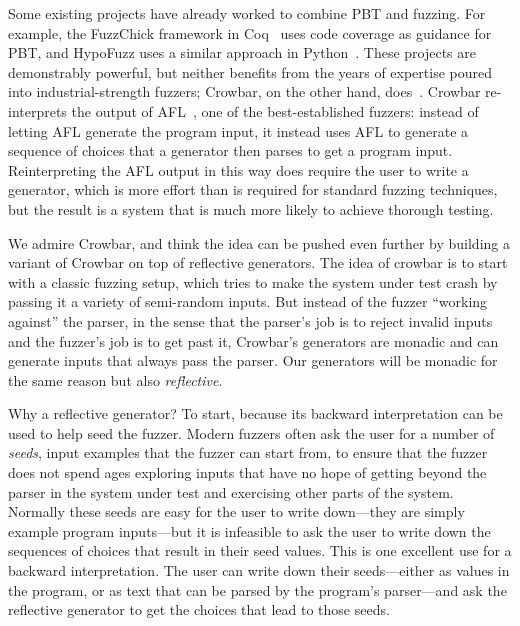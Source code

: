 Some existing projects have already worked to
combine PBT and fuzzing.
For example, the FuzzChick framework in Coq~\cite{DBLP:journals/pacmpl/Lampropoulos0P19}
uses code coverage as guidance for PBT, and HypoFuzz uses a
similar approach in Python~\cite{hatfield-dodds_hypofuzz_nodate}. These projects
are demonstrably powerful, but neither benefits from the years of expertise
poured into industrial-strength fuzzers; Crowbar, on the other hand,
does~\cite{dolan2017testing}. Crowbar re-interprets the output of
AFL~\cite{afl-readme}, one of the best-established
fuzzers: instead of letting AFL generate the program input, it instead uses AFL
to generate a sequence of choices that a generator then parses to get a program input.
Reinterpreting the AFL output in this way
does require the user to write a generator, which is more effort
than is required for
standard fuzzing techniques, but the result is a system that is much more likely
to achieve thorough testing.

We admire Crowbar, and think the idea can be pushed even further by building
a variant of Crowbar on top of reflective generators.
The idea of crowbar is to start with a classic fuzzing setup, which tries to make the
system under test
crash by passing it a variety of semi-random inputs. But instead of
the fuzzer
``working against'' the parser, in the sense that the parser's job is to reject
invalid inputs and the fuzzer's job is to get past it, Crowbar's generators are
monadic and can generate
inputs that always pass the parser. Our generators will be monadic for the same
reason but also {\em reflective}.

Why a reflective generator?
To start,
because its backward interpretation can be used to help seed the fuzzer.
Modern fuzzers often
ask the user for a number of {\em seeds}, input examples that the fuzzer can start from,
to ensure that the fuzzer does not spend ages exploring
inputs that have no hope of getting beyond the parser in the system
under test and exercising other parts of the system. Normally these seeds are easy
for the user to write down---they are simply example program inputs---but
it is infeasible to ask the user to write down the sequences of choices that
result in their seed values.
This is one excellent use for a
backward interpretation. The user can write down their seeds---either as values
in the program, or as text that can be parsed by the program's parser---and
ask the reflective generator to get the choices that lead to those seeds.

